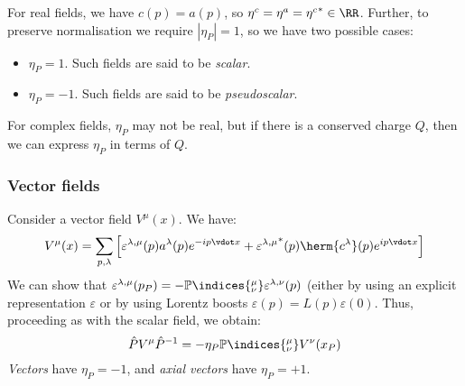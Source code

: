 \documentclass{jknotes}
\begin{document}
For real fields, we have \(c(p) = a(p)\), so \(\eta^c = \eta^a = {\eta^c}^* \in \RR\). Further, to preserve normalisation we require \(|\eta_P| = 1\), so we have two possible cases:
\begin{itemize}
    \item \(\eta_P = 1\). Such fields are said to be \emph{scalar}.
    \item \(\eta_P = -1\). Such fields are said to be \emph{pseudoscalar}.
\end{itemize}

For complex fields, \(\eta_P\) may not be real, but if there is a conserved charge \(Q\), then we can express \(\eta_P\) in terms of \(Q\).

\subsubsection*{Vector fields}
Consider a vector field \(V^\mu(x)\). We have:
\begin{equation}
    V^\mu(x) = \sum_{p,\lambda}\left[ \varepsilon^{\lambda,\mu}(p) a^\lambda(p)e^{-ip\vdot x} + {\varepsilon^{\lambda,\mu}}^*(p) \herm{c^\lambda}(p)e^{ip\vdot x} \right]
\end{equation}
We can show that \(\varepsilon^{\lambda,\mu}(p_P) = -\mathbb{P}\indices{^\mu_\nu}\varepsilon^{\lambda,\nu}(p)\) (either by using an explicit representation \(\varepsilon\) or by using Lorentz boosts \(\varepsilon(p) = L(p)\varepsilon(0)\). Thus, proceeding as with the scalar field, we obtain:
\begin{equation}
    \hat{P}V^\mu\hat{P}^{-1} = -\eta_P \mathbb{P}\indices{^\mu_\nu}V^\nu(x_P)
\end{equation}
\emph{Vectors} have \(\eta_P = -1\), and \emph{axial vectors} have \(\eta_P = +1\).
\end{document}
